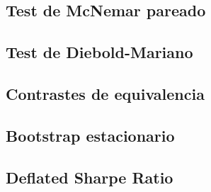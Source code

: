 \subsection{Test de McNemar pareado}
\label{sec:tests-mcnemar}


\subsection{Test de Diebold-Mariano}
\label{sec:tests-dm}

\subsection{Contrastes de equivalencia}
\label{sec:tests-tost}

\subsection{Bootstrap estacionario}
\label{sec:tests-bootstrap}


\subsection{Deflated Sharpe Ratio}
\label{sec:tests-dsr}


